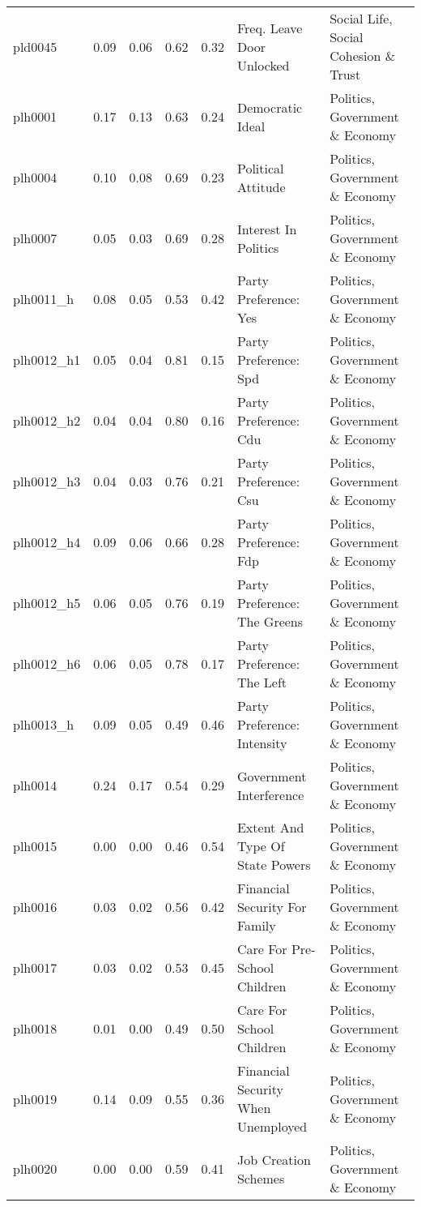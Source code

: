 \begin{longtable}{l|rrrrll}
pld0045 & 0.09 & 0.06 & 0.62 & 0.32 & Freq. Leave Door Unlocked & Social Life, Social Cohesion \& Trust \\ 
plh0001 & 0.17 & 0.13 & 0.63 & 0.24 & Democratic Ideal & Politics, Government \& Economy \\ 
plh0004 & 0.10 & 0.08 & 0.69 & 0.23 & Political Attitude & Politics, Government \& Economy \\ 
plh0007 & 0.05 & 0.03 & 0.69 & 0.28 & Interest In Politics & Politics, Government \& Economy \\ 
plh0011\_h & 0.08 & 0.05 & 0.53 & 0.42 & Party Preference: Yes & Politics, Government \& Economy \\ 
plh0012\_h1 & 0.05 & 0.04 & 0.81 & 0.15 & Party Preference: Spd & Politics, Government \& Economy \\ 
plh0012\_h2 & 0.04 & 0.04 & 0.80 & 0.16 & Party Preference: Cdu & Politics, Government \& Economy \\ 
plh0012\_h3 & 0.04 & 0.03 & 0.76 & 0.21 & Party Preference: Csu & Politics, Government \& Economy \\ 
plh0012\_h4 & 0.09 & 0.06 & 0.66 & 0.28 & Party Preference: Fdp & Politics, Government \& Economy \\ 
plh0012\_h5 & 0.06 & 0.05 & 0.76 & 0.19 & Party Preference: The Greens & Politics, Government \& Economy \\ 
plh0012\_h6 & 0.06 & 0.05 & 0.78 & 0.17 & Party Preference: The Left & Politics, Government \& Economy \\ 
plh0013\_h & 0.09 & 0.05 & 0.49 & 0.46 & Party Preference: Intensity & Politics, Government \& Economy \\ 
plh0014 & 0.24 & 0.17 & 0.54 & 0.29 & Government Interference & Politics, Government \& Economy \\ 
plh0015 & 0.00 & 0.00 & 0.46 & 0.54 & Extent And Type Of State Powers & Politics, Government \& Economy \\ 
plh0016 & 0.03 & 0.02 & 0.56 & 0.42 & Financial Security For Family & Politics, Government \& Economy \\ 
plh0017 & 0.03 & 0.02 & 0.53 & 0.45 & Care For Pre-School Children & Politics, Government \& Economy \\ 
plh0018 & 0.01 & 0.00 & 0.49 & 0.50 & Care For School Children & Politics, Government \& Economy \\ 
plh0019 & 0.14 & 0.09 & 0.55 & 0.36 & Financial Security When Unemployed & Politics, Government \& Economy \\ 
plh0020 & 0.00 & 0.00 & 0.59 & 0.41 & Job Creation Schemes & Politics, Government \& Economy \\ 

\end{longtable}
